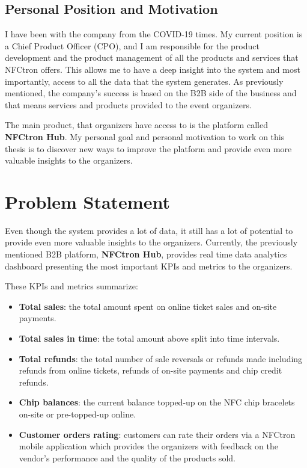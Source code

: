 \subsection*{Personal Position and Motivation}
\label{subsec:introduction-background-motivation}
I have been with the company from the COVID-19 times.
My current position is a Chief Product Officer (CPO), and I am responsible for the product development and the product management of all the products and services that NFCtron offers.
This allows me to have a deep insight into the system and most importantly, access to all the data that the system generates.
As previously mentioned, the company's success is based on the B2B side of the business and that means services and products provided to the event organizers.

The main product, that organizers have access to is the platform called \textbf{NFCtron Hub}.
My personal goal and personal motivation to work on this thesis is to discover new ways to improve the platform and provide even more valuable insights to the organizers.

\section*{Problem Statement}
\label{sec:introduction-problem-statement}
Even though the system provides a lot of data, it still has a lot of potential to provide even more valuable insights to the organizers.
Currently, the previously mentioned B2B platform, \textbf{NFCtron Hub}, provides real time data analytics dashboard presenting the most important KPIs and metrics to the organizers.

These KPIs and metrics summarize:
\begin{itemize}
	\item \textbf{Total sales}: the total amount spent on online ticket sales and on-site payments.
	\item \textbf{Total sales in time}: the total amount above split into time intervals.
	\item \textbf{Total refunds}: the total number of sale reversals or refunds made including refunds from online tickets, refunds of on-site payments and chip credit refunds.
	\item \textbf{Chip balances}: the current balance topped-up on the NFC chip bracelets on-site or pre-topped-up online.
	\item \textbf{Customer orders rating}: customers can rate their orders via a NFCtron mobile application which provides the organizers with feedback on the vendor's performance and the quality of the products sold.
\end{itemize}

